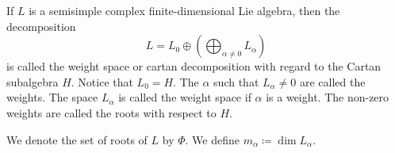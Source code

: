 If $L$ is a semisimple complex finite-dimensional Lie algebra, then the decomposition
\[ L = L_0 \oplus \left(\bigoplus_{\alpha\neq 0} L_{\alpha}\right) \]
is called the weight space or cartan decomposition with regard to the Cartan
subalgebra $H$. Notice that $L_0 = H$. The $\alpha$ such that $L_\alpha\neq 0$ are
called the weights. The space $L_\alpha$ is called the weight space if $\alpha$ is
a weight. The non-zero weights are called the roots with respect to $H$.

We denote the set of roots of $L$ by $\Phi$. We define $m_\alpha\coloneqq \dim L_\alpha$.
